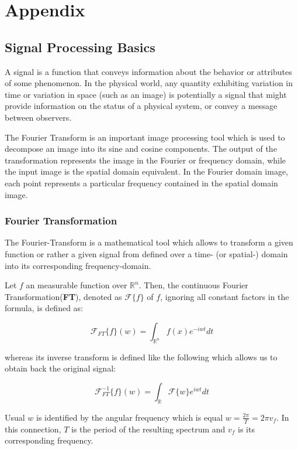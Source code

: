 \chapter{Appendix}
\section{Signal Processing Basics}
A signal is a function that conveys information about the behavior or attributes of some phenomenon.
In the physical world, any quantity exhibiting variation in time or variation in space (such as an image) is potentially a signal that might provide information on the status of a physical system, or convey a message between observers.

The Fourier Transform is an important image processing tool which is used to decompose an image into its sine and cosine components. The output of the transformation represents the image in the Fourier or frequency domain, while the input image is the spatial domain equivalent. In the Fourier domain image, each point represents a particular frequency contained in the spatial domain image. 

\subsection{Fourier Transformation}
The Fourier-Transform is a mathematical tool which allows to transform a given function or rather a given signal from defined over a time- (or spatial-) domain into its corresponding frequency-domain.
 
Let $f$ an measurable function over $\mathds{R}^n$. Then, the continuous Fourier Transformation(\textbf{FT}), denoted as $\mathcal{F}\{f\}$ of $f$, ignoring all constant factors in the formula, is defined as:
 
\begin{equation}
  \mathcal{F}_{FT}\{f\}(w) = \int_{\mathds{R}^n} f(x)e^{-iwt} dt
  \label{eq:cft}
\end{equation}

whereas its inverse transform is defined like the following which allows us to obtain back the original signal:

\begin{equation}
  \mathcal{F}_{FT}^{-1}\{f\}(w) = \int_{\mathds{R}} \mathcal{F}\{w\}e^{iwt} dt
  \label{eq:icft}
\end{equation}

Usual $w$ is identified by the angular frequency which is  equal $w = \frac{2 \pi}{T} = 2 \pi v_f$. In this connection, $T$ is the period of the resulting spectrum and $v_f$ is its corresponding frequency.


